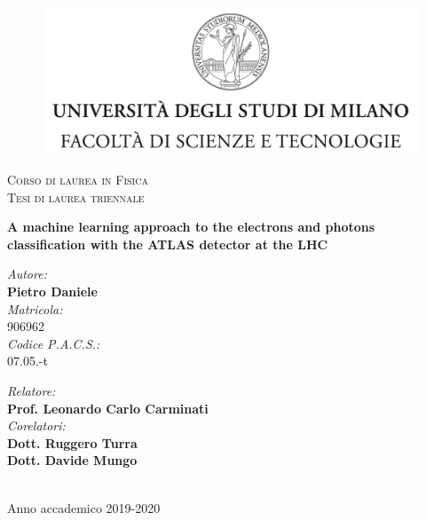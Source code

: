 \documentclass[a4paper, oneside, 11pt, openright]{book}
\begin{document}
	\begin{titlepage}
		\begin{figure}
			\includegraphics[width=\linewidth]{tesi_images/logo.jpg}
		\end{figure}
		\center
		\textsc{\large Corso di laurea in Fisica}\\[0.2cm]
		\textsc{\normalsize Tesi di laurea triennale}\\[2cm]
		
		\begin{doublespace}
			\textbf{\LARGE A machine learning approach to the electrons and photons classification with the ATLAS detector at the LHC}
			\\[2cm]
		\end{doublespace}
		
		\begin{minipage}{0.4\textwidth}
			\begin{flushleft}
				\emph{Autore:} \\[0mm]
				\textbf{Pietro Daniele} \\[4mm]
				\emph{Matricola:}\\
				906962 \\[4mm]
				\emph{Codice P.A.C.S.:}\\[0mm]
				07.05.-t
			\end{flushleft}
		\end{minipage}
		\begin{minipage}{0.4\textwidth}
			\begin{flushright} 
				\emph{Relatore:} \\
				\textbf{Prof. Leonardo Carlo Carminati} \\[1.2em]
				\emph{Corelatori:} \\
				\textbf{Dott. Ruggero Turra} \\
				\textbf{Dott. Davide Mungo} \\[1.2em]
			\end{flushright}
		\end{minipage}\\[2cm]
		\vfill
		Anno accademico 2019-2020
		
	\end{titlepage}
\end{document}
